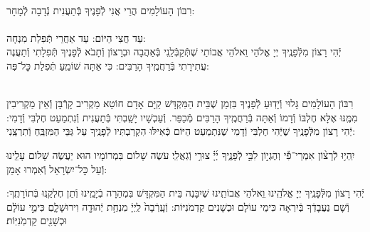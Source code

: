 \documentclass[twoside, openany, parskip=half, 11pt]{book}
\begin{document}
\begin{sometimes}

\\
רִבּוֹן הָעוֹלָמִים הֲרֵי אֲנִי לְֿפָנֶיךָ בְּֿתַעֲנִית נְֿדָבָה לְֿמָחָר:\\
\\
עַד חֲצִי הַיּוֹם:  עַד אַחֲרֵי תְּֿפִלַת מִנְחָה:\\
יְֿהִי רָצוֹן מִלְּֿפָנֶֽיךָ יְיָ אֱלֹהַי וֵאלֹהֵי אֲבוֹתַי שֶׁתְּֿקַבְּֿלֵֽנִי בְּֿאַהֲבָה וּבְרָצוֹן וְֿתָבֹא לְֿפָנֶיךָ תְּֿפִלָתִי
וְֿתַעֲנֶה עֲתִירָתִי בְּֿרַחֲמֶֽיךָ הָרַבִּים: כִּי אַתָּה שׁוֹמֵֽעַ תְּֿפִלַת כׇּל־פֶּה: 

\sepline

\nextpage
{}\\
רִבּוֹן הָעוֹלָמִים גָּלוּי וְֿיָדֽוּעַ לְֿפָנֶיךָ בִּזְמַן שֶׁבֵּית הַמִּקְדָּשׁ קַיָּם אָדָם חוֹטֵא מַקְרִיב קָרְֿבָּן וְֿאֵין מַקְרִיבִין מִמֶּֽנּוּ אֶלָּא חֶלְבּוֹ וְֿדָמוֹ וְֿאַתָּה בְּֿרַחֲמֶֽיךָ הָרַבִּים מְֿכַפֵּר. וְֿעַכְשָׁיו יָשַֽׁבְתִּי בְּֿתַעֲנִית וְֿנִתְמַעֵט חֶלְבִּי וְֿדָמִי: יְֿהִי רָצוֹן מִלְּֿפָנֶֽיךָ שֶׁיְּֿהִי חֶלְבִּי וְֿדָמִי שֶׁנִּתְמַעַט הַיּוֹם כְּֿאִילּוּ הִקְרַבְתִּיו לְֿפָנֶֽיךָ עַל גַּבֵּי הַמִּזְבֵּֽחַ וְֿתִרְצֵֽנִי:


\end{sometimes}

יִֽהְי֥וּ לְֿרָצ֨וֹן אִמְרֵי־פִ֡י וְהֶגְי֣וֹן לִבִּ֣י לְֿפָנֶ֑יךָ יְ֜יָ֗ צוּרִ֥י וְֿגֹֽאֲלִֽי׃ עֹשֶׂה שָׁלוֹם בִּמְרוֹמָיו הוּא יַעֲשֶׂה שָׁלוֹם עָלֵֽינוּ וְֿעַל כׇּל־יִשְׂרָאֵל וְֿאִמְרוּ אָמֵן:


\begin{small}

יְֿהִי רָצוֹן מִלְּֿפָנֶֽיךָ יְיָ אֱלֹהֵֽינוּ וִֵאלֹהֵי אֲבוֹתֵֽינוּ שֶׁיִבָּנֶה בֵּית הַמִּקְדָּשׁ בִּמְהֵרָה בְֿיָמֵֽינוּ וְֿתֵן חֶלְקֵֽנוּ בְּֿתוֹרָתֶֽךָ: וְֿשָׁם נַעֲבָדְֿךָ בְּֿיִרְאָה כִּימֵי עוֹלָם וּכְשָׁנִים קַדְמֹנִיּוֹת:
וְֿעָֽרְֿבָה֙ לַֽיְיָ֔ מִנְחַ֥ת יְֿהוּדָ֖ה וִירוּשָׁלָ֑םִ כִּימֵ֣י עוֹלָ֔ם וּכְשָׁנִ֖ים קַדְמֹֽנִיּֽוֹת׃


\end{small}



\\
\end{document}

